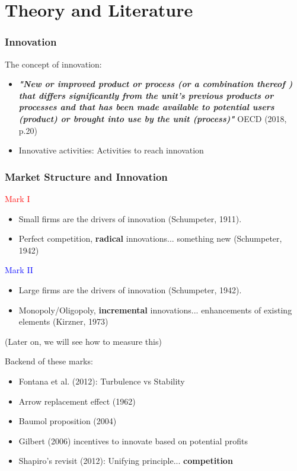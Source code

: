 \documentclass{beamer}
\begin{document}
\section{Theory and Literature}
	\begin{frame}[allowframebreaks]
		\frametitle{Innovation}
		The concept of innovation:
		\begin{itemize}
			\item \textbf{\textit{"New or improved product or process (or a combination thereof ) that differs
			significantly from the unit's previous products or processes and that has been made available to potential users (product) or brought into use by the unit (process)"}} OECD (2018, p.20)
			\item Innovative activities: Activities to reach innovation
		\end{itemize}
	\end{frame}
	\begin{frame}[allowframebreaks]
		\frametitle{Market Structure and Innovation}
		\textcolor{red}{Mark I}
		\begin{itemize}
			\item Small firms are the drivers of innovation (Schumpeter, 1911).
			\item Perfect competition, \textbf{radical} innovations... something new (Schumpeter, 1942)
		\end{itemize}
		\textcolor{blue}{Mark II}
		\begin{itemize}
			\item Large firms are the drivers of innovation (Schumpeter, 1942).
			\item Monopoly/Oligopoly, \textbf{incremental} innovations... enhancements of existing elements (Kirzner, 1973)
		\end{itemize}	
	(Later on, we will see how to measure this)
		
		\framebreak		
		Backend of these marks:
		\begin{itemize}
			\item Fontana et al. (2012): Turbulence vs Stability
			\item Arrow replacement effect (1962)
			\item Baumol proposition (2004)
			\item Gilbert (2006) incentives to innovate based on potential profits
			\item Shapiro's revisit (2012): Unifying principle... \textbf{competition}
		\end{itemize}	
	\end{frame}
\end{document}
